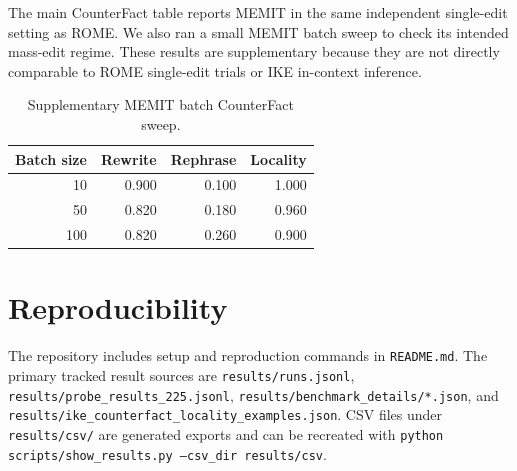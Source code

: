 \documentclass[11pt]{article}
\begin{document}
The main CounterFact table reports MEMIT in the same independent single-edit setting as ROME. We also ran a small MEMIT batch sweep to check its intended mass-edit regime. These results are supplementary because they are not directly comparable to ROME single-edit trials or IKE in-context inference.

\begin{table}[h]
\centering
\small
\begin{tabular*}{\columnwidth}{@{\extracolsep{\fill}}rrrr@{}}
\toprule
Batch size & Rewrite & Rephrase & Locality \\
\midrule
10 & 0.900 & 0.100 & 1.000 \\
50 & 0.820 & 0.180 & 0.960 \\
100 & 0.820 & 0.260 & 0.900 \\
\bottomrule
\end{tabular*}
\caption{Supplementary MEMIT batch CounterFact sweep.}
\label{tab:memit-batch}
\end{table}

\section{Reproducibility}

The repository includes setup and reproduction commands in \texttt{README.md}. The primary tracked result sources are \texttt{results/runs.jsonl}, \texttt{results/probe\_results\_225.jsonl}, \texttt{results/benchmark\_details/*.json}, and \texttt{results/ike\_counterfact\_locality\_examples.json}. CSV files under \texttt{results/csv/} are generated exports and can be recreated with \texttt{python scripts/show\_results.py --csv\_dir results/csv}.
\end{document}
